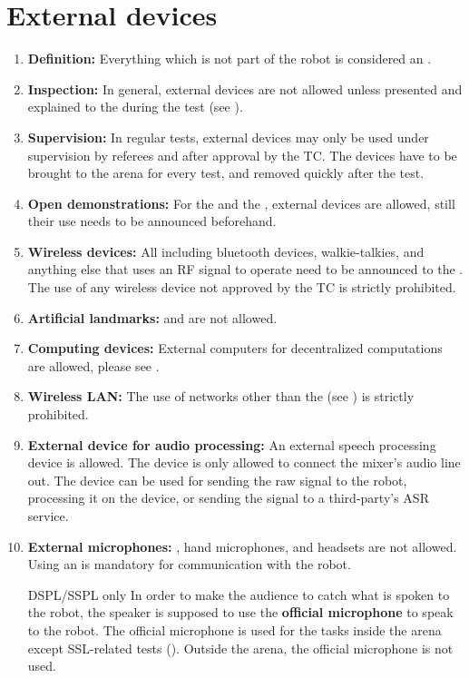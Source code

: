 \section{External devices}\label{rule:roobt_external_devices}
\begin{enumerate}
	\item \textbf{Definition:} Everything which is not part of the robot is considered an . 
	\item \textbf{Inspection:} In general, external devices are not allowed unless presented and explained to the  during the  test (see ).
	\item \textbf{Supervision:} In regular tests, external devices may only be used under supervision by referees and after approval by the TC. The devices have to be brought to the arena for every test, and removed quickly after the test.
	\item \textbf{Open demonstrations:} For the  and the , external devices are allowed, still their use needs to be announced beforehand.
	\item \textbf{Wireless devices:} All  including bluetooth devices, walkie-talkies, and anything else that uses an RF signal to operate need to be announced to the . The use of any wireless device not approved by the TC is strictly prohibited.  
	\item \textbf{Artificial landmarks:}  and  are not allowed.
	\item \textbf{Computing devices:} External computers for decentralized computations are allowed, please see .
	\item \textbf{Wireless LAN:} The use of networks other than the  (see ) is strictly prohibited.
	\item \textbf{External device for audio processing: }An external speech processing device is allowed. The device is only allowed to connect the mixer's audio line out. The device can be used for sending the raw signal to the robot, processing it on the device, or sending the signal to a third-party's ASR service.
	\item \textbf{External microphones: }, hand microphones, and headsets are not allowed. Using an  is mandatory for communication with the robot. 
	\item [DSPL/SSPL only] In order to make the audience to catch what is spoken to the robot, the speaker is supposed to use the \textbf{official microphone} to speak to the robot. The official microphone is used for the tasks inside the arena except SSL-related tests (). Outside the arena, the official microphone is not used.
\end{enumerate}


